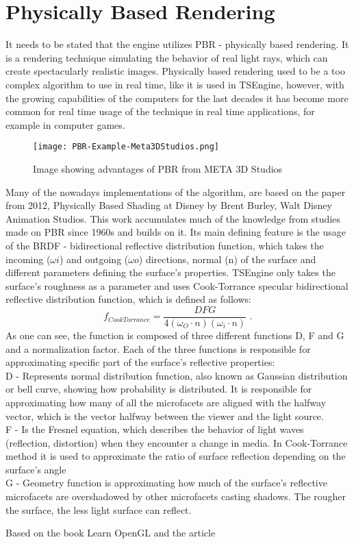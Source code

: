 \newpage
\section{Physically Based Rendering}
\label{sec:pbr}
It needs to be stated that the engine utilizes PBR - physically based rendering. It is a rendering technique simulating the behavior of real light rays, which can create spectacularly realistic images. Physically based rendering used to be a too complex algorithm to use in real time, like it is used in TSEngine, however, with the growing capabilities of the computers for the last decades it has become more common for real time usage of the technique in real time applications, for example in computer games.
\begin{figure}[H]
    \texttt{[image: PBR-Example-Meta3DStudios.png]}
    \caption{Image showing advantages of PBR from META 3D Studios \cite{pbrExample} }
\end{figure}
Many of the nowadays implementations of the algorithm, are based on the paper from 2012, Physically Based Shading at Disney by Brent Burley, Walt Disney Animation Studios. This work accumulates much of the knowledge from studies made on PBR since 1960s and builds on it. Its main defining feature is the usage of the BRDF - bidirectional reflective distribution function, which takes the incoming ($\omega i$) and outgoing ($\omega o$) directions, normal (n) of the surface and different parameters defining the surface's properties. TSEngine only takes the surface's roughness as a parameter and uses Cook-Torrance specular bidirectional reflective distribution function, which is defined as follows:
\begin{equation}
f_{CookTorrance}=\frac{DFG}{4(\omega_{O} \cdot n)(\omega_{i} \cdot n)}
\text{ .}
\label{EquationCookTorrance}
\end{equation}
As one can see, the function is composed of three different functions D, F and G and a normalization factor. Each of the three functions is responsible for approximating specific part of the surface's reflective properties:\\
D - Represents normal distribution function, also known as Gaussian distribution or bell curve, showing how probability is distributed. It is responsible for approximating how many of all the microfacets are aligned with the halfway vector, which is the vector halfway between the viewer and the light source. \\
F - Is the Fresnel equation, which describes the behavior of light waves (reflection, distortion) when they encounter a change in media. In Cook-Torrance method it is used to approximate the ratio of surface reflection depending on the surface's angle\\ 
G - Geometry function is approximating how much of the surface's reflective microfacets are overshadowed by other microfacets casting shadows. The rougher the surface, the less light surface can reflect.

Based on the book Learn OpenGL \cite{learnopengl} and the article \cite{pbrreferences}